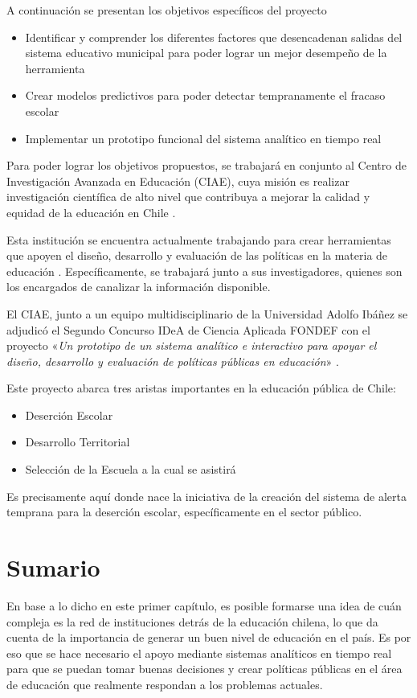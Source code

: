 A continuación se presentan los objetivos específicos del proyecto
\begin{itemize}
\item Identificar y comprender los diferentes factores que desencadenan salidas del sistema educativo municipal para poder lograr un mejor desempeño de la herramienta
\item Crear modelos predictivos para poder detectar tempranamente el fracaso escolar
\item Implementar un prototipo funcional del sistema analítico en tiempo real
\end{itemize}

Para poder lograr los objetivos propuestos, se trabajará en conjunto al Centro de Investigación Avanzada en Educación (CIAE), cuya misión es realizar investigación científica de alto nivel que contribuya a mejorar la calidad y equidad de la educación en Chile \cite{ciae}.

Esta institución se encuentra actualmente trabajando para crear herramientas que apoyen el diseño, desarrollo y evaluación de las políticas en la materia de educación \cite{tools}. Específicamente, se  trabajará junto a sus investigadores, quienes son los encargados de canalizar la información disponible.

El CIAE, junto a un equipo multidisciplinario de la Universidad Adolfo Ibáñez se adjudicó el Segundo Concurso IDeA de Ciencia Aplicada FONDEF con el proyecto «\textit{Un prototipo de un sistema analítico e interactivo para apoyar el diseño, desarrollo y evaluación de políticas públicas en educación}» \cite{noticia}. 

Este proyecto abarca tres aristas importantes en la educación pública de Chile:
\begin{itemize}
    \item Deserción Escolar
    \item Desarrollo Territorial
    \item Selección de la Escuela a la cual se asistirá
\end{itemize}

Es precisamente aquí donde nace la iniciativa de la creación del sistema de alerta temprana para la deserción escolar, específicamente en el sector público. 

\section{Sumario}

En base a lo dicho en este primer capítulo, es posible formarse una idea de cuán compleja es la red de instituciones detrás de la educación chilena, lo que da cuenta de la importancia de generar un buen nivel de educación en el país. Es por eso que se hace necesario el apoyo mediante sistemas analíticos en tiempo real para que se puedan tomar buenas decisiones y crear políticas públicas en el área de educación que realmente respondan a los problemas actuales. 


